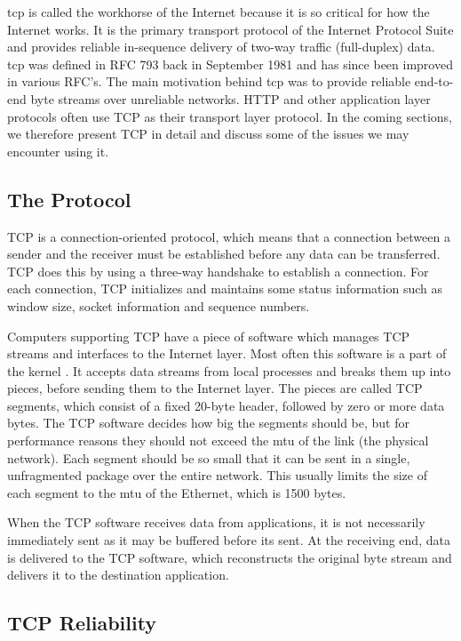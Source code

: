 \gls{tcp} is called the workhorse of the Internet because it is so critical for
how the Internet works. It is the primary transport protocol of the Internet
Protocol Suite\cite{rfc-1122} and provides reliable in-sequence delivery of
two-way traffic (full-duplex) data. \gls{tcp} was defined in RFC
793\cite{rfc-793} back in September 1981 and has since been improved in various
RFC's. The main motivation behind \gls{tcp} was to provide reliable end-to-end
byte streams over unreliable networks. HTTP and other application layer
protocols often use TCP as their transport layer protocol. In the coming
sections, we therefore present TCP in detail and discuss some of the issues we
may encounter using it.

 \subsection{The Protocol}

 TCP is a connection-oriented protocol, which means that a connection between a
 sender and the receiver must be established before any data can be transferred.
 TCP does this by using a three-way handshake to establish a connection. For
 each connection, TCP initializes and maintains some status information such as
 window size, socket information and sequence numbers.

Computers supporting TCP have a piece of software which manages TCP streams and
interfaces to the Internet layer. Most often this software is a part of the
kernel \cite{computer-networks}. It accepts data streams from local processes
and breaks them up into pieces, before sending them to the Internet layer. The
pieces are called TCP segments, which consist of a fixed 20-byte header,
followed by zero or more data bytes. The TCP software decides how big the
segments should be, but for performance reasons they should not exceed the
\gls{mtu} of the link (the physical network). Each segment should be so small
that it can be sent in a single, unfragmented package over the entire network.
This usually limits the size of each segment to the \gls{mtu} of the Ethernet,
which is 1500 bytes.

When the TCP software receives data from applications, it is not necessarily
immediately sent as it may be buffered before its sent. At the receiving end,
data is delivered to the TCP software, which reconstructs the original byte
stream and delivers it to the destination application.


\subsection{TCP Reliability}

